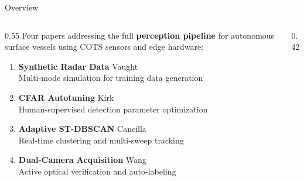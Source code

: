 \documentclass[aspectratio=169, 10pt]{beamer}
\begin{document}
\begin{frame}{Overview}
  \begin{columns}[T]
    \begin{column}{0.55\textwidth}
      Four papers addressing the full \textbf{perception pipeline} for autonomous surface vessels using COTS sensors and edge hardware:
      \vspace{0.5em}
      \begin{enumerate}
        \item[\textcolor{Garnet}{\textbf{1}}] \textbf{Synthetic Radar Data} \hfill {\scriptsize Vaught}\\
              {\small Multi-mode simulation for training data generation}
        \vspace{0.4em}
        \item[\textcolor{Atlantic}{\textbf{2}}] \textbf{CFAR Autotuning} \hfill {\scriptsize Kirk}\\
              {\small Human-supervised detection parameter optimization}
        \vspace{0.4em}
        \item[\textcolor{Congaree}{\textbf{3}}] \textbf{Adaptive ST-DBSCAN} \hfill {\scriptsize Cancilla}\\
              {\small Real-time clustering and multi-sweep tracking}
        \vspace{0.4em}
        \item[\textcolor{Horseshoe}{\textbf{4}}] \textbf{Dual-Camera Acquisition} \hfill {\scriptsize Wang}\\
              {\small Active optical verification and auto-labeling}
      \end{enumerate}
    \end{column}
    \begin{column}{0.42\textwidth}
      \centering
    \end{column}
  \end{columns}
\end{frame}
\end{document}
